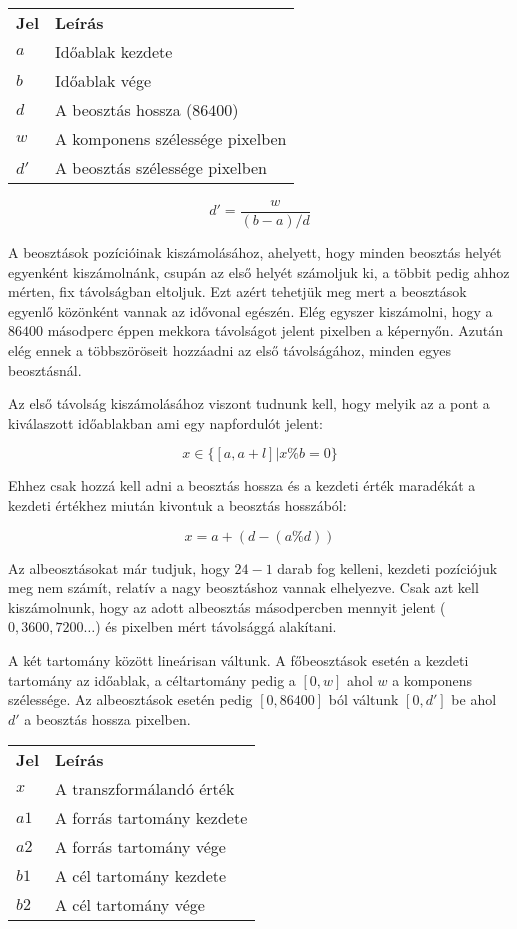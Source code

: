 \begin{tabular}{@{}ll@{}}
	\textbf{Jel} & \textbf{Leírás} \\
	$a$ & Időablak kezdete \\
	$b$ & Időablak vége \\
	$d$ & A beosztás hossza ($86400$) \\
	$w$ & A komponens szélessége pixelben \\
	$d'$ & A beosztás szélessége pixelben \\
\end{tabular}
$$d' = \frac{w}{(b - a) / d}$$

A beosztások pozícióinak kiszámolásához, ahelyett, hogy minden beosztás helyét egyenként kiszámolnánk, csupán az első helyét számoljuk ki, a többit pedig ahhoz mérten, fix távolságban eltoljuk. Ezt azért tehetjük meg mert a beosztások egyenlő közönként vannak az idővonal egészén. Elég egyszer kiszámolni, hogy a $86400$ másodperc éppen mekkora távolságot jelent pixelben a képernyőn. Azután elég ennek a többszöröseit hozzáadni az első távolságához, minden egyes beosztásnál.

Az első távolság kiszámolásához viszont tudnunk kell, hogy melyik az a pont a kiválaszott időablakban ami egy napfordulót jelent:

$$ x \in \{[a, a+l] | x \% b = 0\} $$

Ehhez csak hozzá kell adni a beosztás hossza és a kezdeti érték maradékát a kezdeti értékhez miután kivontuk a beosztás hosszából:

$$x = a + (d - (a \% d))$$

Az albeosztásokat már tudjuk, hogy $24 - 1$ darab fog kelleni, kezdeti pozíciójuk meg nem számít, relatív a nagy beosztáshoz vannak elhelyezve. Csak azt kell kiszámolnunk, hogy az adott albeosztás másodpercben mennyit jelent ($0, 3600, 7200 \dots $) és pixelben mért távolsággá alakítani.


A két tartomány között lineárisan váltunk. A főbeosztások esetén a kezdeti tartomány az időablak, a céltartomány pedig a $[0, w]$ ahol $w$ a komponens szélessége. Az albeosztások esetén pedig $[0, 86400]$ ból váltunk $[0, d']$ be ahol $d'$ a beosztás hossza pixelben.

\begin{tabular}{@{}ll@{}}
	\textbf{Jel} & \textbf{Leírás} \\
	$x$ & A transzformálandó érték \\
	$a1$ & A forrás tartomány kezdete \\
	$a2$ & A forrás tartomány vége \\
	$b1$ & A cél tartomány kezdete \\
	$b2$ & A cél tartomány vége \\
\end{tabular}

